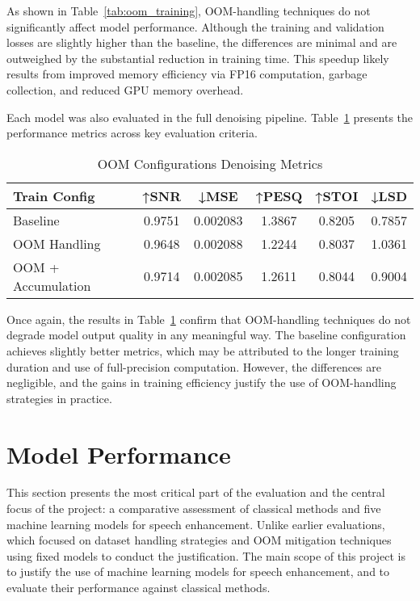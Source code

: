 As shown in Table~\ref{tab:oom_training}, OOM-handling techniques do not significantly affect model performance. Although the training and validation losses are slightly higher than the baseline, the differences are minimal and are outweighed by the substantial reduction in training time. This speedup likely results from improved memory efficiency via FP16 computation, garbage collection, and reduced GPU memory overhead.

Each model was also evaluated in the full denoising pipeline. Table~\ref{tab:oom_metrics} presents the performance metrics across key evaluation criteria.

\vspace{1em}
\begin{table}[H]
\centering
\caption{OOM Configurations Denoising Metrics}
\label{tab:oom_metrics}
\begin{tabular}{|l|c|c|c|c|c|}
\hline
\textbf{Train Config} & \textbf{↑SNR} & \textbf{↓MSE} & \textbf{↑PESQ} & \textbf{↑STOI} & \textbf{↓LSD} \\
\hline
Baseline               & 0.9751 & 0.002083 & 1.3867 & 0.8205 & 0.7857 \\
OOM Handling           & 0.9648 & 0.002088 & 1.2244 & 0.8037 & 1.0361 \\
OOM + Accumulation     & 0.9714 & 0.002085 & 1.2611 & 0.8044 & 0.9004 \\
\hline
\end{tabular}
\end{table}

Once again, the results in Table~\ref{tab:oom_metrics} confirm that OOM-handling techniques do not degrade model output quality in any meaningful way. The baseline configuration achieves slightly better metrics, which may be attributed to the longer training duration and use of full-precision computation. However, the differences are negligible, and the gains in training efficiency justify the use of OOM-handling strategies in practice.

\section{Model Performance}
\label{sec:model_performance}

This section presents the most critical part of the evaluation and the central focus of the project: a comparative assessment of classical methods and five machine learning models for speech enhancement. Unlike earlier evaluations, which focused on dataset handling strategies and OOM mitigation techniques using fixed models to conduct the justification. The main scope of this project is to justify the use of machine learning models for speech enhancement, and to evaluate their performance against classical methods.


